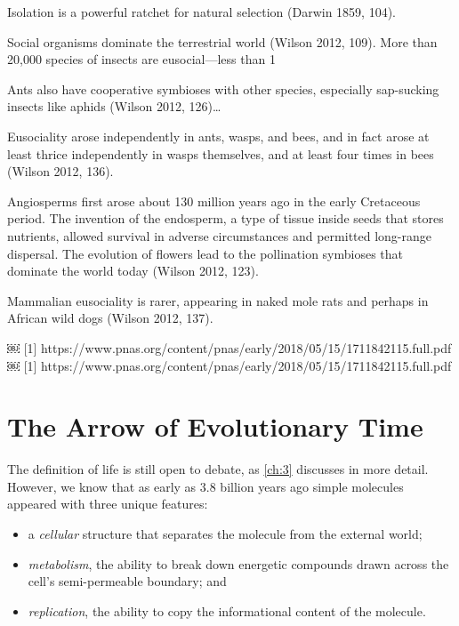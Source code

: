 \documentclass{tufte-book} %
\begin{document}
Isolation is a powerful ratchet for natural selection (Darwin 1859, 104).

Social organisms dominate the terrestrial world (Wilson 2012, 109). More than 20,000 species of insects are eusocial—less than 1%

Ants also have cooperative symbioses with other species, especially sap-sucking insects like aphids (Wilson 2012, 126)…

Eusociality arose independently in ants, wasps, and bees, and in fact arose at least thrice independently in wasps themselves, and at least four times in bees (Wilson 2012, 136). 

Angiosperms first arose about 130 million years ago in the early Cretaceous period. The invention of the endosperm, a type of tissue inside seeds that stores nutrients, allowed survival in adverse circumstances and permitted long-range dispersal. The evolution of flowers lead to the pollination symbioses that dominate the world today (Wilson 2012, 123).

Mammalian eusociality is rarer, appearing in naked mole rats and perhaps in African wild dogs (Wilson 2012, 137).  


￼
[1] https://www.pnas.org/content/pnas/early/2018/05/15/1711842115.full.pdf
￼
[1] https://www.pnas.org/content/pnas/early/2018/05/15/1711842115.full.pdf


\section{The Arrow of Evolutionary Time}\label{arrow-evol}


The definition of life is still open to debate, as \ref{ch:3} discusses in more detail. However, we know that as early as 3.8 billion years ago simple molecules appeared with three unique features: 

\begin{itemize}
    \item{a \emph{cellular} structure that separates the molecule from the external world;}
    \item{\emph{metabolism}, the ability to break down energetic compounds drawn across the cell’s semi-permeable boundary; and}
    \item{\emph{replication}, the ability to copy the informational content of the molecule.}
\end{itemize}
\end{document}
